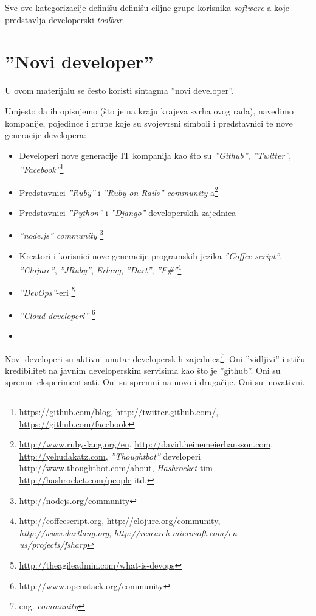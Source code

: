 \documentclass[times, utf8, seminar]{fit}
\begin{document}
Sve ove kategorizacije definišu definišu ciljne grupe korisnika \emph{software}-a koje predstavlja developerski \emph{toolbox}.

\section{''Novi developer''}

U ovom materijalu se često koristi sintagma ''novi developer''.

Umjesto da ih opisujemo (što je na kraju krajeva svrha ovog rada), navedimo kompanije, pojedince i grupe koje su svojevrsni simboli i predstavnici te nove generacije developera:
\begin{itemize}
	\item Developeri nove generacije IT kompanija kao što su \emph{''Github''}, \emph{''Twitter''}, \emph{''Facebook''}\footnote{\url{https://github.com/blog}, \url{http://twitter.github.com/}, \url{https://github.com/facebook}} 
\       \item Predstavnici \emph{''Ruby''} i \emph{''Ruby on Rails'' community}-a\footnote{\url{http://www.ruby-lang.org/en}, \url{http://david.heinemeierhansson.com}, \url{http://yehudakatz.com}, \emph{''Thoughtbot''} developeri \url{http://www.thoughtbot.com/about}, \emph{Hashrocket} tim \url{http://hashrocket.com/people} itd.}
        \item Predstavnici \emph{''Python''} i \emph{''Django''} developerskih zajednica
        \item \emph{''node.js'' community} \footnote{\url{http://nodejs.org/community}}
        \item Kreatori i korisnici nove generacije programskih jezika \emph{''Coffee script''}, \emph{''Clojure''}, \emph{''JRuby''}, \emph{Erlang}, \emph{''Dart''}, \emph{''F\#''}\footnote{\url{http://coffeescript.org}, \url{http://clojure.org/community}, \emph{http://www.dartlang.org}, \emph{http://research.microsoft.com/en-us/projects/fsharp}}
	\item \emph{''DevOps''}-eri \footnote{\url{http://theagileadmin.com/what-is-devops}}
	\item \emph{''Cloud developeri''} \footnote{\url{http://www.openstack.org/community}}
	\item 
\end{itemize}

Novi developeri su aktivni unutar developerskih zajednica\footnote{eng. \emph{community}}. Oni ''vidljivi'' i stiču kredibilitet na javnim developerskim servisima kao što je ''github''. Oni su spremni eksperimentisati. Oni su spremni na novo i drugačije. Oni su inovativni.
\end{document}
